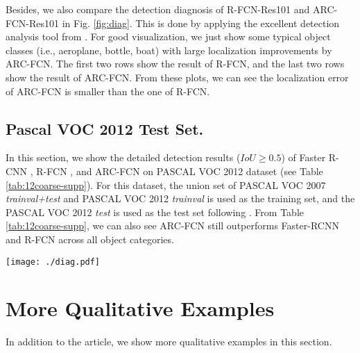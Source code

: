 \documentclass[10pt,twocolumn,letterpaper]{article}
\begin{document}
\begin{appendix}
Besides, we also compare the detection diagnosis of R-FCN-Res101 and ARC-FCN-Res101 in Fig. \ref{fig:diag}. This is done by applying the excellent detection analysis tool from \cite{hoiem_diag}. 
For good visualization, we just show some typical object classes (i.e., aeroplane, bottle, boat) with large localization improvements by ARC-FCN.
The first two rows show the result of R-FCN, and the last two rows show the result of ARC-FCN. From these plots, we can see the localization error of ARC-FCN is smaller than the one of R-FCN.

\subsection{Pascal VOC 2012 Test Set.}
In this section, we show the detailed detection results ($IoU \ge 0.5$) of Faster R-CNN \cite{faster_rcnn}, R-FCN \cite{rfcn}, and ARC-FCN on PASCAL VOC 2012 dataset (see Table \ref{tab:12coarse-supp}). 
For this dataset, the union set of PASCAL VOC 2007 \textit{trainval+test} and PASCAL VOC 2012 \textit{trainval} is used as the training set, and the PASCAL VOC 2012 \textit{test} is used as the test set following \cite{faster_rcnn,rfcn}.
From Table \ref{tab:12coarse-supp}, we can also see ARC-FCN still outperforms Faster-RCNN and R-FCN across all object categories.



\begin{figure*}
\centering
{\texttt{[image: ./diag.pdf]}}
\caption{False positive/detection trends with rank. 
Detection analysis of R-FCN are shown on the first $2$ rows. Detection analysis of ARC-FCN are shown on the last $2$ rows.
The First and Third Rows: type of detection as number of detections increases; 
The Second and Fourth Rows: stacked area plot showing fraction of FP of each type as the total number of FP increase.
line plots show recall as function of the number of objects (dashed=weak localization, solid=strong localization).}
\label{fig:diag}
\end{figure*}

\section{More Qualitative Examples}

In addition to the article, we show more qualitative examples in this section.


\end{appendix}
\end{document}
